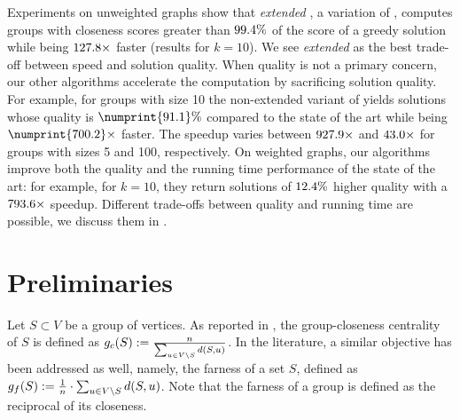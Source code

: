 Experiments on unweighted graphs show that \emph{extended} \growshrink, a
variation of \growshrink, computes groups with closeness scores greater than
$\onedigit{\gsPSevenFiveKQualNum}\%$ of the score of a greedy solution while
being $\onedigit{\gsPSevenFiveKSpeed}\times$ faster (results for $k= 10$).
We see \emph{extended} \growshrink as the best trade-off between
speed and solution quality.
%
When quality is not a primary concern, our other algorithms accelerate the
computation by sacrificing solution quality. For example, for groups with size
10 the non-extended variant of \growshrink yields solutions whose quality is
$\numprint{91.1}\%$ compared to the state of the art while being
$\numprint{700.2}\times$ faster.
The speedup varies between $\onedigit{\gsMaxSpeed}\times$
and $\onedigit{\gsMinSpeed}\times$ for groups with sizes 5 and 100,
respectively.
%
On weighted graphs, our algorithms improve both the quality and
the running time performance of the state of the art: for example, for $k = 10$,
they return solutions of $\onedigit{\wGSQualInc}\%$ higher
quality with a $\onedigit{\wGSSpeed}\times$ speedup. Different trade-offs
between quality and running time are possible, we discuss them in
.



\section{Preliminaries}
\label{sec:lsh-gc-preliminaries}
%
Let $S \subset V$ be a group of vertices. As reported in
, the group-closeness centrality of $S$ is
defined as $g_c(S) := \frac{n}{\sum_{u \in V \setminus S} d(S, u)}$. In the
literature, a similar objective has been addressed as well, namely, the farness
of a set $S$, defined as $g_f (S) := \frac{1}{n}\cdot \sum_{u \in V
\setminus S}d(S, u)$. Note that the farness of a group is defined as the
reciprocal of its closeness.



